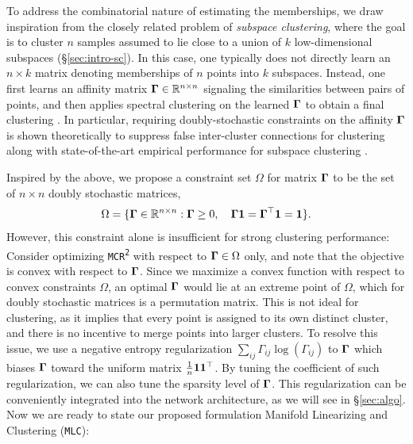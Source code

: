 \documentclass[10pt,twocolumn,letterpaper]{article}
\newcommand{\ours}{MLC}
\newcommand{\mours}{\texttt{\ours}}
\newcommand{\mcr}{\texttt{MCR\textsuperscript{2}}}
\begin{document}
    To address the combinatorial nature of estimating the memberships, we draw inspiration from the closely related problem of \textit{subspace clustering}, where the goal is to cluster $n$ samples assumed to lie close to a union of $k$ low-dimensional subspaces (\S \ref{sec:intro-sc}). In this case, one typically does not directly learn an $n\times k$ matrix denoting memberships of $n$ points into $k$ subspaces. Instead, one first learns an affinity matrix $\boldsymbol{\Gamma}\in{\mathbb{R}}^{n\times n}$ signaling the similarities between pairs of points, and then applies spectral clustering on the learned $\boldsymbol{\Gamma}$ to obtain a final clustering \cite{Elhamifar2009-bw,Elhamifar2013-de,Lu2012-lz,Liu2013-sl,Heckel2015-hm,You2016-ob}. In particular, requiring doubly-stochastic constraints on the affinity $\boldsymbol{\Gamma}$ is shown theoretically to suppress false inter-cluster connections for clustering \cite{Ding2022-zd} along with state-of-the-art empirical performance for subspace clustering \cite{Lim2020-sh}.
   
   Inspired by the above, we propose a constraint set $\Omega$ for matrix $\boldsymbol{\Gamma}$ to be the set of $n\times n$ doubly stochastic matrices, 
   \begin{equation}
       \Omega = \{\boldsymbol{\Gamma} \in {\mathbb{R}}^{n\times n}: \boldsymbol{\Gamma} \geq 0, \quad \boldsymbol{\Gamma} {\bm{1}} = \boldsymbol{\Gamma}^\top {\bm{1}} = {\bm{1}}\}.
   \end{equation}
   However, this constraint alone is insufficient for strong clustering performance: Consider optimizing \mcr{} with respect to $\boldsymbol{\Gamma}\in\Omega$ only, and note that the objective is convex with respect to $\boldsymbol{\Gamma}$. Since we maximize a convex function with respect to convex constraints $\Omega$, an optimal $\boldsymbol{\Gamma}$ would lie at an extreme point of $\Omega$, which for doubly stochastic matrices is a permutation matrix. This is not ideal for clustering, as it implies that every point is assigned to its own distinct cluster, and there is no incentive to merge points into larger clusters.  
   To resolve this issue, we use a negative entropy regularization $\sum_{ij} \Gamma_{ij} \log(\Gamma_{ij})$ to $\boldsymbol{\Gamma}$ which biases $\boldsymbol{\Gamma}$ toward the uniform matrix $\tfrac{1}{n} \bm{1} \bm{1}^\top$. By tuning the coefficient of such regularization, we can also tune the sparsity level of $\boldsymbol{\Gamma}$. This regularization can be conveniently integrated into the network architecture, as we will see in \S \ref{sec:algo}.  Now we are ready to state our proposed formulation Manifold Linearizing and Clustering (\mours{}): 
   \def\txtmcrseobj{
   \underbrace{\log\det\left(\mI + \frac{d}{n\epsilon^2} \mZ \mZ^\top \right)}_{\Rexp} - \underbrace{\frac{1}{n} \sum_{j=1}^{n} \log\det\left(\mI + \frac{d}{\epsilon^2} \mZ \Diag((\bGamma)_j) \mZ^\top \right)}_{\Rcom{\bGamma}} 
   }
   \def\txtmcrds{
   \bGamma = h_{\btheta}(\mX) \in \Omega
   }
\end{document}
